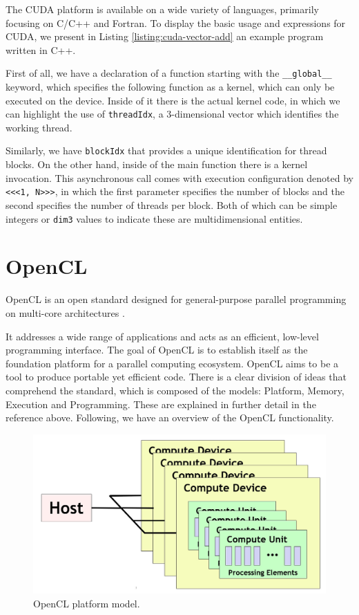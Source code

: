 The CUDA platform is available on a wide variety of languages, primarily focusing on C/C++ and Fortran.
To display the basic usage and expressions for CUDA, we present in Listing \ref{listing:cuda-vector-add} an example program written in C++.
\pagebreak



First of all, we have a declaration of a function starting with the \texttt{\_\_global\_\_} keyword, which specifies the following function as a kernel, which can only be executed on the device.
Inside of it there is the actual kernel code, in which we can highlight the use of \texttt{threadIdx}, a 3-dimensional vector which identifies the working thread.

Similarly, we have \texttt{blockIdx} that provides a unique identification for thread blocks.
On the other hand, inside of the main function there is a kernel invocation.
This asynchronous call comes with execution configuration denoted by \texttt{<}\texttt{<}\texttt{<1, N>}\texttt{>}\texttt{>}, in which the first parameter specifies the number of blocks and the second specifies the number of threads per block.
Both of which can be simple integers or \texttt{dim3} values to indicate these are multidimensional entities.

\section{OpenCL}

OpenCL is an open standard designed for general-purpose parallel programming on multi-core architectures \cite{Viñas:2018:Heterogeneous, Reyes:2012:Directive}.

It addresses a wide range of applications and acts as an efficient, low-level programming interface. The goal of OpenCL is to establish itself as the foundation platform for a parallel computing ecosystem.
OpenCL aims to be a tool to produce portable yet efficient code.
There is a clear division of ideas that comprehend the standard, which is composed of the models: Platform, Memory, Execution and Programming.
These are explained in further detail in the reference above.
Following, we have an overview of the OpenCL functionality.

\begin{figure}[H]
	\centering
	\includegraphics[width=0.7\linewidth]{images/opencl_platform_model.jpg}
	\caption{OpenCL platform model.}
	\label{fig:opencl-platform-model}
\end{figure}

